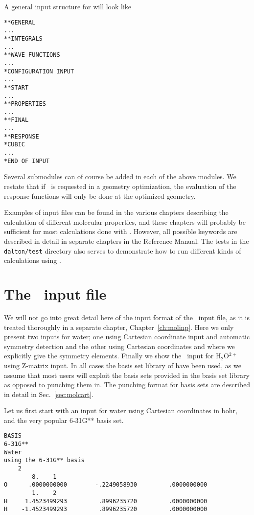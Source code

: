 A general input structure for {\dalton} will look like

\begin{verbatim}
**GENERAL
...
**INTEGRALS
...
**WAVE FUNCTIONS
...
*CONFIGURATION INPUT
...
**START
...
**PROPERTIES
...
**FINAL
...
**RESPONSE
*CUBIC
...
*END OF INPUT
\end{verbatim}

Several submodules can of course be added in each of the above
modules. We restate that if \resp\ is requested in a geometry
optimization, the evaluation of the response functions will only be
done at the optimized geometry.

Examples of input files can be found in the various chapters
describing the calculation of different molecular properties, and
these chapters will probably be sufficient for most calculations done
with {\dalton}. However, all possible keywords are described in detail
in separate chapters in the Reference Manual. The tests in the
\verb|dalton/test| directory also serves to demonstrate how to run
different kinds of calculations using {\dalton}.

\section{The \mol\ input file}

We will not go into great detail here of the input format of the \mol\ input
file, as it is treated thoroughly in a separate chapter,
Chapter~\ref{ch:molinp}. Here we only present two inputs for
water; one
using Cartesian coordinate input and
automatic symmetry detection and
the other using Cartesian coordinates and where we explicitly give the
symmetry elements. Finally we show the \mol\ input for H$_{2}$O$^{2+}$
using Z-matrix input. In
all cases the basis set library of {\dalton} have been used, as we
assume that most users will exploit the basis sets provided in the basis
set library as opposed to punching them in. The punching
format for basis sets are described in detail in Sec.~\ref{sec:molcart}.

Let us first start with an input for water using Cartesian coordinates
in bohr, and the very popular 6-31G** basis set.

\begin{verbatim}
BASIS
6-31G**
Water
using the 6-31G** basis
    2
        8.    1
O      .0000000000        -.2249058930         .0000000000
        1.    2
H     1.4523499293         .8996235720         .0000000000
H    -1.4523499293         .8996235720         .0000000000
\end{verbatim}

